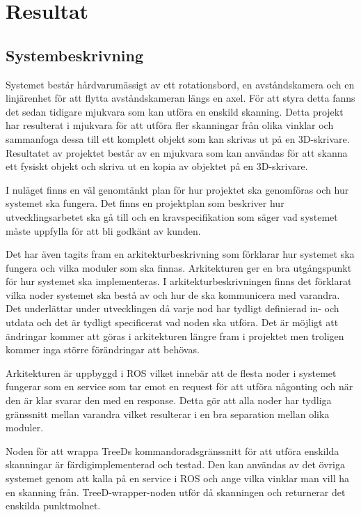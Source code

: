 \chapter{Resultat}
\label{cha:results}

\section{Systembeskrivning}

Systemet består hårdvarumässigt av ett rotationsbord, en avståndskamera och en linjärenhet för att flytta avståndskameran längs en axel. För att styra detta fanns det sedan tidigare mjukvara som kan utföra en enskild skanning. Detta projekt har resulterat i mjukvara för att utföra fler skanningar från olika vinklar och sammanfoga dessa till ett komplett objekt som kan skrivas ut på en 3D-skrivare. Resultatet av projektet består av en mjukvara som kan användas för att skanna ett fysiskt objekt och skriva ut en kopia av objektet på en 3D-skrivare.

I nuläget finns en väl genomtänkt plan för hur projektet ska genomföras och hur systemet ska fungera. Det finns en projektplan som beskriver hur utvecklingsarbetet ska gå till och en kravspecifikation som säger vad systemet måste uppfylla för att bli godkänt av kunden.

Det har även tagits fram en arkitekturbeskrivning som förklarar hur systemet ska fungera och vilka moduler som ska finnas. Arkitekturen ger en bra utgångspunkt för hur systemet ska implementeras. I arkitekturbeskrivningen finns det förklarat vilka noder systemet ska bestå av och hur de ska kommunicera med varandra. Det underlättar under utvecklingen då varje nod har tydligt definierad in- och utdata och det är tydligt specificerat vad noden ska utföra. Det är möjligt att ändringar kommer att göras i arkitekturen längre fram i projektet men troligen kommer inga större förändringar att behövas.

Arkitekturen är uppbyggd i ROS vilket innebär att de flesta noder i systemet fungerar som en service som tar emot en request för att utföra någonting och när den är klar svarar den med en response. Detta gör att alla noder har tydliga gränssnitt mellan varandra vilket resulterar i en bra separation mellan olika moduler.

Noden för att wrappa TreeDs kommandoradsgränssnitt för att utföra enskilda skanningar är färdigimplementerad och testad. Den kan användas av det övriga systemet genom att kalla på en service i ROS och ange vilka vinklar man vill ha en skanning från. TreeD-wrapper-noden utför då skanningen och returnerar det enskilda punktmolnet.

